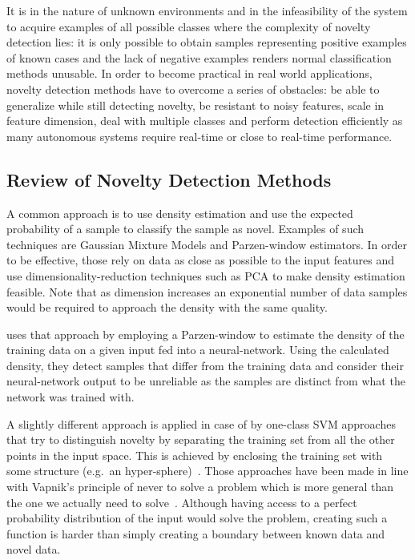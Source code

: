 It is in the nature of unknown environments and in the infeasibility of
the system to acquire examples of all possible classes where the complexity of
novelty detection lies: it is only possible to obtain samples representing positive
examples of known cases and the lack of negative examples renders normal
classification methods unusable.
In order to become practical in real world applications, novelty detection
methods have to overcome a series of obstacles:
be able to generalize while still detecting novelty,
be resistant to noisy features,
scale in feature dimension,
deal with multiple classes and perform detection efficiently as many
autonomous systems require real-time or close to real-time performance.

\subsection{Review of Novelty Detection Methods}
A common approach is to use density estimation and use the expected probability
of a sample to classify the sample as novel. Examples of such techniques are
Gaussian Mixture Models and Parzen-window estimators. In order to be effective,
those rely on data as close as possible to the input features and use
dimensionality\hyp{}reduction techniques such as \gls{PCA} to make density
estimation feasible. Note that as dimension increases an exponential number
of data samples would be required to approach the density with the same quality.

\cite{bishop1994novelty} uses that approach by employing a Parzen-window to
estimate the density of the training data on a given input fed into a
neural-network. Using the calculated density, they detect samples
that differ from the training data and consider their neural-network output
to be unreliable as the samples are distinct from what the network was trained
with.

A slightly different approach is applied in case of by one-class \gls{SVM} approaches that
try to distinguish novelty by separating the training set from all the other
points in the input space. This is achieved by enclosing the training
set with some structure (e.g.\ an hyper-sphere)~\cite{bennett2000support}.
Those approaches have been made in line with Vapnik's principle of never to solve a 
problem which is more general than the one we actually need to solve~\cite{scholkopf2000support}.
Although having access to a perfect probability distribution
of the input would solve the problem, creating such a function is harder than
simply creating a boundary between known data and novel data.

